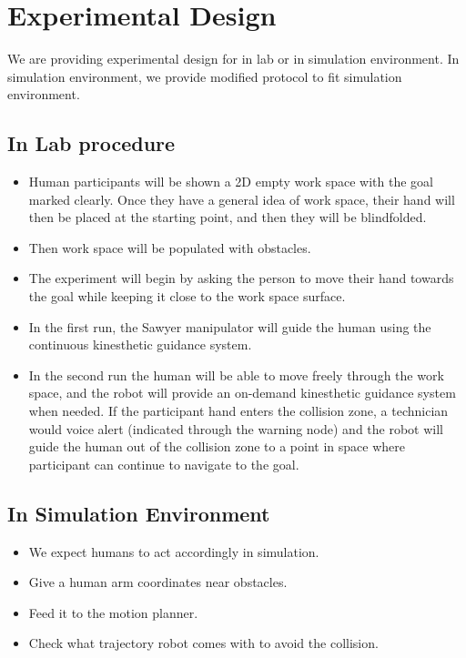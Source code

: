\section{Experimental Design}
We are providing experimental design for in lab or in simulation environment. In simulation environment, we provide modified protocol to fit simulation environment. 

\subsection{In Lab procedure}
\begin{itemize}
    \item Human participants will be shown a 2D empty work space with the goal marked clearly. Once they have a general idea of work space, their hand will then be placed at the starting point, and then they will be blindfolded.
    \item Then work space will be populated with obstacles.
    \item The experiment will begin by asking the person to move their hand towards the goal while keeping it close to the work space surface.
    \item In the first run, the Sawyer manipulator will guide the human using the continuous kinesthetic guidance system.
    \item In the second run the human will be able to move freely through the work space, and the robot will provide an on-demand kinesthetic guidance system when needed. If the participant hand enters the collision zone, a technician would voice alert (indicated through the warning node) and the robot will guide the human out of the collision zone to a point in space where participant can continue to navigate to the goal.
\end{itemize}
\subsection{In Simulation Environment}
\begin{itemize}
    \item We expect humans to act accordingly in simulation. 
    \item Give a human arm coordinates near obstacles. 
    \item Feed it to the motion planner.
    \item Check what trajectory robot comes with to avoid the collision.
\end{itemize}

